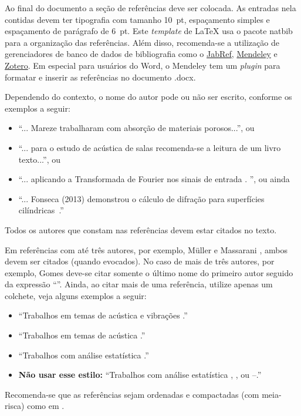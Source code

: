 \documentclass[12pt, a4paper, twoside, twocolumn]{article}
\begin{document}

Ao final do documento a seção de referências deve ser colocada. As entradas nela contidas devem ter tipografia com tamanho 10~pt, espaçamento simples e espaçamento de parágrafo de 6~pt. Este \textit{template} de \LaTeX\xspace usa o pacote {\ttfamily natbib} para a organização das referências. Além disso, recomenda-se a utilização de gerenciadores de banco de dados de bibliografia como o \href{http://www.jabref.org/}{JabRef}, \href{http://www.mendeley.com}{Mendeley} e \href{https://www.zotero.org/}{Zotero}. Em especial para usuários do Word, o Mendeley tem um \textit{plugin} para formatar e inserir as referências no documento .docx.



Dependendo do contexto, o nome do autor pode ou não ser escrito, conforme os exemplos a seguir: 
%
\begin{itemize}[noitemsep,topsep=0ex] \itemsep=4pt
	\item 	``... Mareze \etal \cite{Mareze-2019} trabalharam com absorção de materiais porosos...'', ou 
	
	\item ``... para o estudo de acústica de salas \cite{Brandao-2017} recomenda-se a leitura de um livro texto...'', ou
	\item ``... aplicando a Transformada de Fourier nos sinais de entrada \cite{Oppenheim-2010}. '', ou ainda
	\item ``... Fonseca (2013) demonstrou o cálculo de difração para superfícies cilíndricas~\cite{Fonseca-2013}.''
\end{itemize}
%
Todos os autores que constam nas referências devem estar citados no texto.

Em referências com até três autores, por exemplo, Müller e Massarani \cite{Muller-2001}, ambos devem ser citados (quando evocados). No caso de mais de três autores, por exemplo, Gomes \etal \cite{Gomes-2015} deve-se citar somente o último nome do primeiro autor seguido da expressão ``\etal''. Ainda, ao citar mais de uma referência, utilize apenas um colchete, veja alguns exemplos a seguir:
%
\begin{itemize}[noitemsep,topsep=0ex] \itemsep=8pt
	\item ``Trabalhos em temas de acústica e vibrações \cite{Mareze-2017,Fonseca-2013,Brandao-2017}.''
	\item ``Trabalhos em temas de acústica \cite{Mareze-2017,Oppenheim-2010,Muller-2001,Mareze-2019}.''
	\item ``Trabalhos com análise estatística \cite{Mareze-2017, Brandao-2017, Borges-2018}.''
		\item \textbf{Não usar esse estilo:} ``Trabalhos com análise estatística \cite{Mareze-2017}, \cite{Brandao-2017}, \cite{Ristow-2016} ou \cite{Mareze-2017}--\cite{Ristow-2016}.''
\end{itemize}
%
Recomenda-se que as referências sejam ordenadas e compactadas (com meia-risca) como em \cite{Mareze-2017,Oppenheim-2010,Muller-2001,Mareze-2019}.
\end{document}
